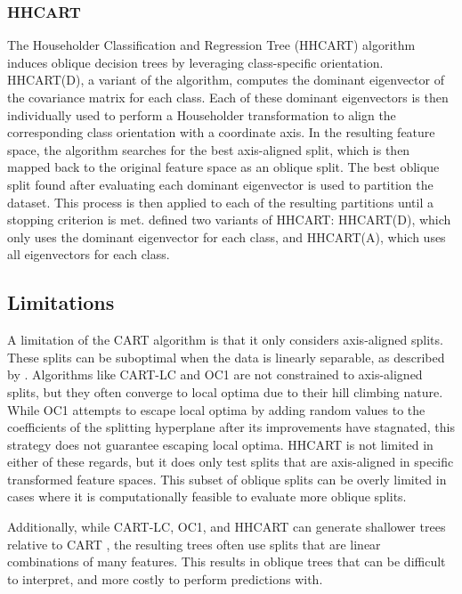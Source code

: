 \documentclass[10pt]{article} %
\begin{document}
\subsubsection{HHCART}

The Householder Classification and Regression Tree (HHCART) algorithm \citep{HHCart} induces oblique decision trees by leveraging class-specific orientation. HHCART(D), a variant of the algorithm, computes the dominant eigenvector of the covariance matrix for each class. Each of these dominant eigenvectors is then individually used to perform a Householder transformation to align the corresponding class orientation with a coordinate axis. In the resulting feature space, the algorithm searches for the best axis-aligned split, which is then mapped back to the original feature space as an oblique split. The best oblique split found after evaluating each dominant eigenvector is used to partition the dataset. This process is then applied to each of the resulting partitions until a stopping criterion is met. \citet{HHCart} defined two variants of HHCART: HHCART(D), which only uses the dominant eigenvector for each class, and HHCART(A), which uses all eigenvectors for each class.

\subsection{Limitations}\label{Limitations}

A limitation of the CART algorithm is that it only considers axis-aligned splits. These splits can be suboptimal when the data is linearly separable, as described by \citet{breiman1984cart}. Algorithms like CART-LC and OC1 are not constrained to axis-aligned splits, but they often converge to local optima due to their hill climbing nature. While OC1 attempts to escape local optima by adding random values to the coefficients of the splitting hyperplane after its improvements have stagnated, this strategy does not guarantee escaping local optima. HHCART is not limited in either of these regards, but it does only test splits that are axis-aligned in specific transformed feature spaces. This subset of oblique splits can be overly limited in cases where it is computationally feasible to evaluate more oblique splits.

Additionally, while CART-LC, OC1, and HHCART can generate shallower trees relative to CART \citep{MurthyKS94}, the resulting trees often use splits that are linear combinations of many features. This results in oblique trees that can be difficult to interpret, and more costly to perform predictions with.
\end{document}
